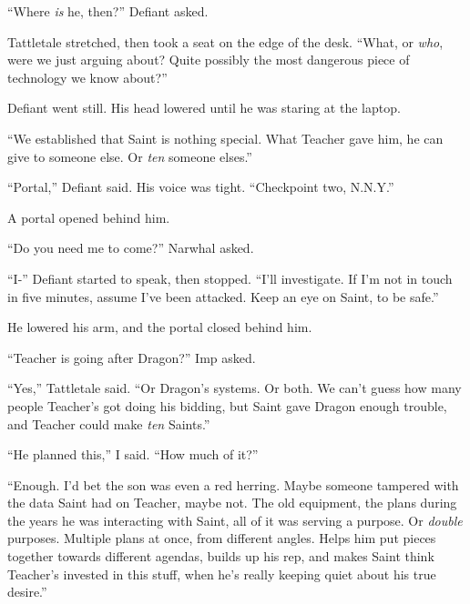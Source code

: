 ``Where \emph{is} he, then?'' Defiant asked.



Tattletale stretched, then took a seat on the edge of the desk.  ``What, or \emph{who}, were we just arguing about?  Quite possibly the most dangerous piece of technology we know about?''



Defiant went still.  His head lowered until he was staring at the laptop.



``We established that Saint is nothing special.  What Teacher gave him, he can give to someone else.  Or \emph{ten} someone elses.''



``Portal,'' Defiant said.  His voice was tight.  ``Checkpoint two, N.N.Y.''



A portal opened behind him.



``Do you need me to come?''  Narwhal asked.



``I-'' Defiant started to speak, then stopped.  ``I'll investigate.  If I'm not in touch in five minutes, assume I've been attacked.  Keep an eye on Saint, to be safe.''



He lowered his arm, and the portal closed behind him.



``Teacher is going after Dragon?''  Imp asked.



``Yes,'' Tattletale said.  ``Or Dragon's systems.  Or both.  We can't guess how many people Teacher's got doing his bidding, but Saint gave Dragon enough trouble, and Teacher could make \emph{ten} Saints.''



``He planned this,'' I said.  ``How much of it?''



``Enough.  I'd bet the son was even a red herring.  Maybe someone tampered with the data Saint had on Teacher, maybe not.  The old equipment, the plans during the years he was interacting with Saint, all of it was serving a purpose.  Or \emph{double} purposes.  Multiple plans at once, from different angles.  Helps him put pieces together towards different agendas, builds up his rep, and makes Saint think Teacher's invested in this stuff, when he's really keeping quiet about his true desire.''




